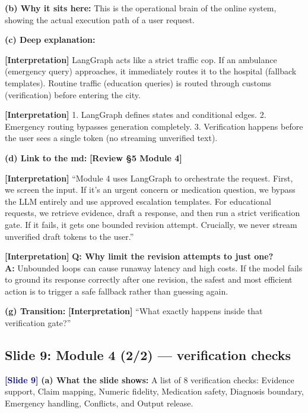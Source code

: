 \documentclass[11pt,a4paper]{article}
\newcommand{\origintag}[2]{\textcolor{#1}{\small\textbf{[#2]}}}
\begin{document}
\textbf{(b) Why it sits here:} This is the operational brain of the online system, showing the actual execution path of a user request.

\textbf{(c) Deep explanation:}
\begin{analogy}
\origintag{slate}{Interpretation} LangGraph acts like a strict traffic cop. If an ambulance (emergency query) approaches, it immediately routes it to the hospital (fallback templates). Routine traffic (education queries) is routed through customs (verification) before entering the city.
\end{analogy}
\origintag{slate}{Interpretation} 1. LangGraph defines states and conditional edges. 2. Emergency routing bypasses generation completely. 3. Verification happens before the user sees a single token (no streaming unverified text).

\textbf{(d) Link to the md:} \origintag{amber}{Review \S5 Module 4}

\begin{sayit}
\origintag{slate}{Interpretation} ``Module 4 uses LangGraph to orchestrate the request. First, we screen the input. If it's an urgent concern or medication question, we bypass the LLM entirely and use approved escalation templates. For educational requests, we retrieve evidence, draft a response, and then run a strict verification gate. If it fails, it gets one bounded revision attempt. Crucially, we never stream unverified draft tokens to the user.''
\end{sayit}

\begin{qa}
\origintag{slate}{Interpretation} \textbf{Q: Why limit the revision attempts to just one?} \\
\textbf{A:} Unbounded loops can cause runaway latency and high costs. If the model fails to ground its response correctly after one revision, the safest and most efficient action is to trigger a safe fallback rather than guessing again.
\end{qa}
\textbf{(g) Transition:} \origintag{slate}{Interpretation} ``What exactly happens inside that verification gate?''

\subsection{Slide 9: Module 4 (2/2) --- verification checks}
\origintag{navy}{Slide 9}
\textbf{(a) What the slide shows:} A list of 8 verification checks: Evidence support, Claim mapping, Numeric fidelity, Medication safety, Diagnosis boundary, Emergency handling, Conflicts, and Output release.
\end{document}
